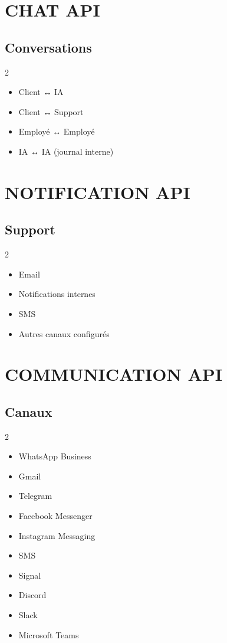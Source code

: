 \documentclass[12pt,a4paper,oneside]{book}
\begin{document}
\chapter{CHAT API}

\section{Conversations}
\begin{multicols}{2}
\begin{itemize}
\item Client ↔ IA
\item Client ↔ Support
\item Employé ↔ Employé
\item IA ↔ IA (journal interne)
\end{itemize}
\end{multicols}

\chapter{NOTIFICATION API}

\section{Support}
\begin{multicols}{2}
\begin{itemize}
\item Email
\item Notifications internes
\item SMS
\item Autres canaux configurés
\end{itemize}
\end{multicols}

\chapter{COMMUNICATION API}

\section{Canaux}
\begin{multicols}{2}
\begin{itemize}
\item WhatsApp Business
\item Gmail
\item Telegram
\item Facebook Messenger
\item Instagram Messaging
\item SMS
\item Signal
\item Discord
\item Slack
\item Microsoft Teams
\end{itemize}
\end{multicols}
\end{document}
